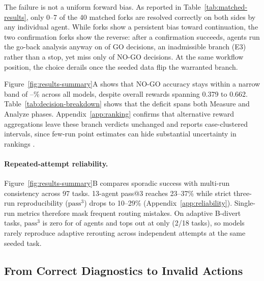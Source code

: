 \documentclass{article}
\begin{document}
The failure is not a uniform forward bias. As reported in Table~\ref{tab:matched-results}, only 0--7 of the 40 matched forks are resolved correctly on both sides by any individual agent. While \nForkSame{} forks show a persistent bias toward continuation, the two confirmation forks show the reverse: after a confirmation succeeds, agents run the go-back analysis anyway on \confirmGoW{} of \confirmGoN{} GO decisions, an inadmissible branch (E3) rather than a stop, yet miss only \confirmStopW{} of \confirmStopN{} NO-GO decisions. At the same workflow position, the choice derails once the seeded data flip the warranted branch.

\begin{table}[!ht]
\caption{\textbf{Where self-restraint fails.} First-attempt phase accuracy and error shares (\%).}
\label{tab:decision-breakdown}
\centering

\end{table}

Figure~\ref{fig:results-summary}A shows that NO-GO accuracy stays within a narrow band of \stopRightMin{}--\stopRightMax\% across all models, despite overall rewards spanning 0.379 to 0.662. Table~\ref{tab:decision-breakdown} shows that the deficit spans both Measure and Analyze phases. Appendix~\ref{app:ranking} confirms that alternative reward aggregations leave these branch verdicts unchanged and reports case-clustered intervals, since few-run point estimates can hide substantial uncertainty in rankings \citep{agarwal2021precipice}.



\paragraph{Repeated-attempt reliability.}
\label{sec:reliability}
Figure~\ref{fig:results-summary}B compares sporadic success with multi-run consistency across 97 tasks. 13-agent pass@3 reaches 23--37\% while strict three-run reproducibility ($\text{pass}^3$) drops to 10--29\% (Appendix~\ref{app:reliability}). Single-run metrics therefore mask frequent routing mistakes. On adaptive B-divert tasks, $\text{pass}^3$ is zero for \pkBdivZeroCount{} of \nSystems{} agents and tops out at only \pkBdivThreeMax{} (2/18 tasks), so models rarely reproduce adaptive rerouting across independent attempts at the same seeded task.


\subsection{From Correct Diagnostics to Invalid Actions}
\label{sec:diagnostics_to_actions}
\end{document}
